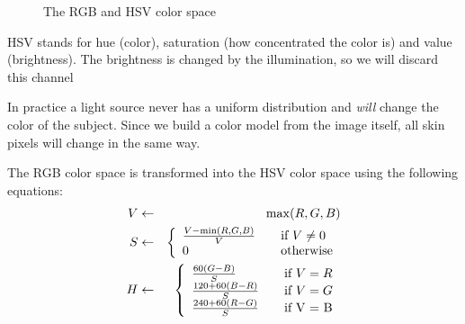 \begin{figure}[htbp]
  \centering
{}
\hspace{0.01\linewidth}
  \caption{The RGB and HSV color space}
  \label{fig:colorspaces}
\end{figure}

HSV stands for hue (color), saturation (how concentrated the color is) and value (brightness). The brightness is changed by the illumination, so we will discard this channel

In practice a light source never has a uniform distribution and \emph{will} change the color of the subject. Since we build a color model from the image itself, all skin pixels will change in the same way. 

The RGB color space is transformed into the HSV color space using the following equations:
\begin{eqnarray*}
  V & \leftarrow & \max(R,G,B) \\
  S & \leftarrow & \left\{
  \begin{array}{l l}
    \frac{V-\min(R, G, B)}{V} & \quad \text{if $V \neq 0$} \\
    0 						  & \quad \text{otherwise} \\
  \end{array} \right.\\
  H & \leftarrow & \left\{
  \begin{array}{l l}
    \frac{60(G - B)}{S}     & \quad \text{if $V = R$} \\
    \frac{120 + 60(B-R)}{S} & \quad \text{if $V = G$} \\
    \frac{240 + 60(R-G)}{S} & \quad \text{if V = B} \\
  \end{array} \right.\\
\end{eqnarray*}

